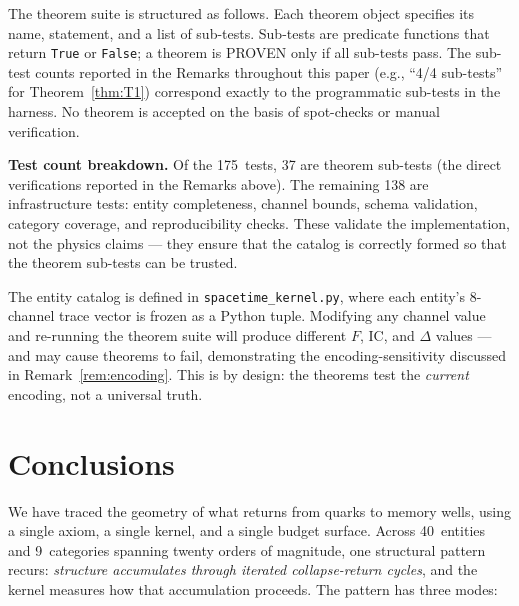 \documentclass[
  aps,
  prd,
  twocolumn,
  superscriptaddress,
  nofootinbib,
  floatfix
]{revtex4-2}
\newcommand{\IC}{\mathrm{IC}}
\begin{document}
The theorem suite is structured as follows.  Each theorem
object specifies its name, statement, and a list of
sub-tests.  Sub-tests are predicate functions that return
\texttt{True} or \texttt{False}; a theorem is PROVEN only
if all sub-tests pass.  The sub-test counts reported in
the Remarks throughout this paper (e.g., ``4/4 sub-tests''
for Theorem~\ref{thm:T1}) correspond exactly to the
programmatic sub-tests in the harness.  No theorem is
accepted on the basis of spot-checks or manual verification.

\textbf{Test count breakdown.}
Of the 175~tests, 37 are theorem sub-tests (the direct
verifications reported in the Remarks above).  The remaining
138 are infrastructure tests: entity completeness, channel
bounds, schema validation, category coverage, and
reproducibility checks.  These validate the implementation,
not the physics claims --- they ensure that the catalog is
correctly formed so that the theorem sub-tests can be
trusted.

The entity catalog is defined in
\texttt{spacetime\_kernel.py}, where each entity's 8-channel
trace vector is frozen as a Python tuple.  Modifying any
channel value and re-running the theorem suite will produce
different $F$, $\IC$, and $\Delta$ values --- and may cause
theorems to fail, demonstrating the encoding-sensitivity
discussed in Remark~\ref{rem:encoding}.  This is by design:
the theorems test the \emph{current} encoding, not a
universal truth.


\section{Conclusions}\label{sec:conclusions}

We have traced the geometry of what returns from quarks to
memory wells, using a single axiom, a single kernel, and a
single budget surface.  Across 40~entities and 9~categories
spanning twenty orders of magnitude, one structural pattern
recurs: \emph{structure accumulates through iterated
collapse-return cycles}, and the kernel measures how that
accumulation proceeds.  The pattern has three modes:
\end{document}
